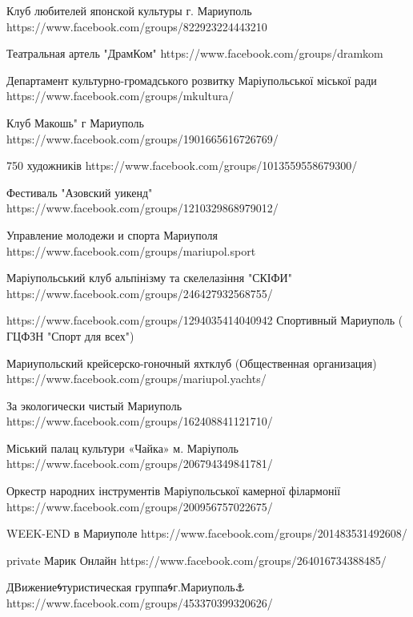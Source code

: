  
 
 
 
 

Клуб любителей японской культуры г. Мариуполь
https://www.facebook.com/groups/822923224443210

Театральная артель "ДрамКом"
https://www.facebook.com/groups/dramkom

Департамент культурно-громадського розвитку Маріупольської міської ради
https://www.facebook.com/groups/mkultura/

Клуб Макошь" г Мариуполь
https://www.facebook.com/groups/1901665616726769/

750 художників
https://www.facebook.com/groups/1013559558679300/

Фестиваль "Азовский уикенд"
https://www.facebook.com/groups/1210329868979012/

Управление молодежи и спорта Мариуполя
https://www.facebook.com/groups/mariupol.sport

Маріупольський клуб альпінізму та скелелазіння "СКІФИ"
https://www.facebook.com/groups/246427932568755/

https://www.facebook.com/groups/1294035414040942
Спортивный Мариуполь ( ГЦФЗН "Спорт для всех")

Мариупольский крейсерско-гоночный яхтклуб (Общественная организация)
https://www.facebook.com/groups/mariupol.yachts/

За экологически чистый Мариуполь
https://www.facebook.com/groups/162408841121710/

Міський палац культури «Чайка» м. Маріуполь
https://www.facebook.com/groups/206794349841781/

Оркестр народних інструментів Маріупольської камерної філармонії
https://www.facebook.com/groups/200956757022675/

WEEK-END в Мариуполе
https://www.facebook.com/groups/201483531492608/

private
Марик Онлайн
https://www.facebook.com/groups/264016734388485/

ДВижение🌀туристическая группа🌀г.Мариуполь⚓
https://www.facebook.com/groups/453370399320626/
